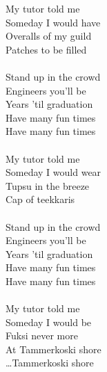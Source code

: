 
            My tutor told me \\
            Someday I would have \\
            Overalls of my guild  \\
            Patches to be filled \\
\hspace{10mm} \\
            Stand up in the crowd  \\
            Engineers you'll be  \\
            Years 'til graduation  \\
            Have many fun times  \\
            Have many fun times \\
\hspace{10mm} \\
            My tutor told me \\
            Someday I would wear  \\
            Tupsu in the breeze  \\
            Cap of teekkaris \\
\hspace{10mm} \\
            Stand up in the crowd  \\
            Engineers you'll be  \\
            Years 'til graduation  \\
            Have many fun times  \\
            Have many fun times \\
\hspace{10mm} \\
            My tutor told me  \\
            Someday I would be \\
            Fuksi never more  \\
            At Tammerkoski shore \\
            …Tammerkoski shore \\
